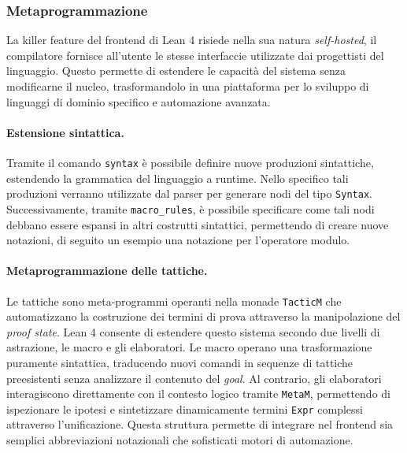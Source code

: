 \subsubsection{Metaprogrammazione}
La killer feature del frontend di Lean 4 risiede nella sua natura \textit{self-hosted}, il compilatore fornisce all'utente le stesse interfaccie utilizzate dai progettisti del linguaggio. 
Questo permette di estendere le capacità del sistema senza modificarne il nucleo, trasformandolo in una piattaforma per lo sviluppo di linguaggi di dominio specifico e automazione avanzata.

\paragraph{Estensione sintattica.}
Tramite il comando \texttt{syntax} è possibile definire nuove produzioni sintattiche, estendendo la grammatica del linguaggio a runtime. Nello specifico tali produzioni verranno utilizzate
dal parser per generare nodi del tipo \texttt{Syntax}. Successivamente, tramite \texttt{macro\_rules}, è possibile specificare come tali nodi debbano essere espansi in altri costrutti sintattici, 
permettendo di creare nuove notazioni, di seguito un esempio una notazione per l'operatore modulo.

\paragraph{Metaprogrammazione delle tattiche.}
Le tattiche sono meta-programmi operanti nella monade \texttt{TacticM} che automatizzano la costruzione dei termini di prova attraverso la manipolazione del \textit{proof state}. 
Lean 4 consente di estendere questo sistema secondo due livelli di astrazione, le macro e gli elaboratori. Le macro operano una trasformazione puramente sintattica, traducendo nuovi 
comandi in sequenze di tattiche preesistenti senza analizzare il contenuto del \textit{goal}. Al contrario, gli elaboratori interagiscono direttamente con il contesto logico tramite 
\texttt{MetaM}, permettendo di ispezionare le ipotesi e sintetizzare dinamicamente termini \texttt{Expr} complessi attraverso l'unificazione. Questa struttura permette di integrare 
nel frontend sia semplici abbreviazioni notazionali che sofisticati motori di automazione.

